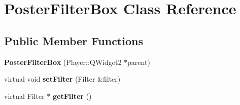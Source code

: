 \hypertarget{classPosterFilterBox}{}\section{Poster\+Filter\+Box Class Reference}
\label{classPosterFilterBox}
\subsection*{Public Member Functions}
\begin{DoxyCompactItemize}
\item 
\hypertarget{classPosterFilterBox_aab5c885d3d3dc38068df6ffa158c1ad9}{}{\bfseries Poster\+Filter\+Box} (Player\+::\+Q\+Widget2 $\ast$parent)\label{classPosterFilterBox_aab5c885d3d3dc38068df6ffa158c1ad9}

\item 
\hypertarget{classPosterFilterBox_a09e99b0db09b8468ce7d7e0f98293ac5}{}virtual void {\bfseries set\+Filter} (Filter \&filter)\label{classPosterFilterBox_a09e99b0db09b8468ce7d7e0f98293ac5}

\item 
\hypertarget{classPosterFilterBox_ad7b14770615490d1445c958c79fd3adb}{}virtual Filter $\ast$ {\bfseries get\+Filter} ()\label{classPosterFilterBox_ad7b14770615490d1445c958c79fd3adb}

\end{DoxyCompactItemize}
